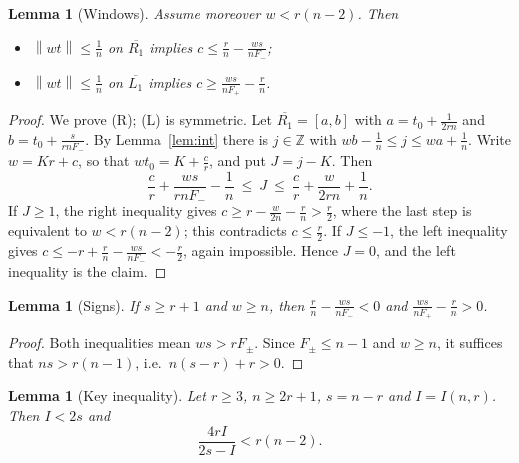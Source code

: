\documentclass[11pt]{article}
\newtheorem{lemma}[theorem]{Lemma}
\theoremstyle{definition}
\newcommand{\Z}{\mathbb{Z}}
\newcommand{\norm}[1]{\left\lVert #1 \right\rVert}
\begin{document}
\begin{lemma}[Windows]\label{lem:win}
Assume moreover $w<r(n-2)$. Then
\begin{itemize}
\item[\textup{(R)}] $\norm{wt}\le\frac1n$ on $\overline{R_1}$ implies
$c\le\frac rn-\frac{ws}{nF_-}$;
\item[\textup{(L)}] $\norm{wt}\le\frac1n$ on $\overline{L_1}$ implies
$c\ge\frac{ws}{nF_+}-\frac rn$.
\end{itemize}
\end{lemma}

\begin{proof}
We prove (R); (L) is symmetric. Let $\overline{R_1}=[a,b]$ with
$a=t_0+\frac1{2rn}$ and $b=t_0+\frac{s}{rnF_-}$. By
Lemma~\ref{lem:int} there is $j\in\Z$ with
$wb-\frac1n\le j\le wa+\frac1n$. Write $w=Kr+c$, so that
$wt_0=K+\frac cr$, and put $J=j-K$. Then
\[
\frac cr+\frac{ws}{rnF_-}-\frac1n\ \le\ J\ \le\
\frac cr+\frac{w}{2rn}+\frac1n .
\]
If $J\ge1$, the right inequality gives
$c\ge r-\frac w{2n}-\frac rn>\frac r2$, where the last step is
equivalent to $w<r(n-2)$; this contradicts $c\le\frac r2$. If
$J\le-1$, the left inequality gives
$c\le-r+\frac rn-\frac{ws}{nF_-}<-\frac r2$, again impossible. Hence
$J=0$, and the left inequality is the claim.
\end{proof}

\begin{lemma}[Signs]\label{lem:sign}
If $s\ge r+1$ and $w\ge n$, then $\frac rn-\frac{ws}{nF_-}<0$ and
$\frac{ws}{nF_+}-\frac rn>0$.
\end{lemma}

\begin{proof}
Both inequalities mean $ws>rF_\pm$. Since $F_\pm\le n-1$ and $w\ge n$,
it suffices that $ns>r(n-1)$, i.e.\ $n(s-r)+r>0$.
\end{proof}

\begin{lemma}[Key inequality]\label{lem:key}
Let $r\ge3$, $n\ge2r+1$, $s=n-r$ and $I=I(n,r)$. Then $I<2s$ and
\[
\frac{4rI}{2s-I}<r(n-2).
\]
\end{lemma}
\end{document}
